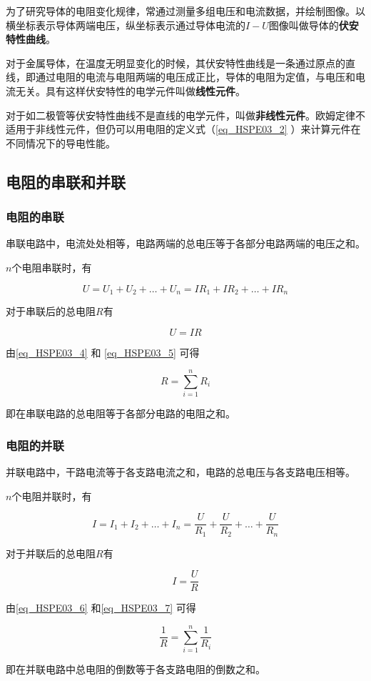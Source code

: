 为了研究导体的电阻变化规律，常通过测量多组电压和电流数据，并绘制图像。以横坐标表示导体两端电压，纵坐标表示通过导体电流的$I-U$图像叫做导体的\textbf{伏安特性曲线}。

对于金属导体，在温度无明显变化的时候，其伏安特性曲线是一条通过原点的直线，即通过电阻的电流与电阻两端的电压成正比，导体的电阻为定值，与电压和电流无关。具有这样伏安特性的电学元件叫做\textbf{线性元件}。

对于如二极管等伏安特性曲线不是直线的电学元件，叫做\textbf{非线性元件}。欧姆定律不适用于非线性元件，但仍可以用电阻的定义式（\autoref{eq_HSPE03_2} ）来计算元件在不同情况下的导电性能。

\subsection{电阻的串联和并联}

\subsubsection{电阻的串联}

串联电路中，电流处处相等，电路两端的总电压等于各部分电路两端的电压之和。

$n$个电阻串联时，有

\begin{equation}\label{eq_HSPE03_4}
U=U_1+U_2+\dots +U_n=IR_1+IR_2+\dots +IR_n
\end{equation}

对于串联后的总电阻$R$有

\begin{equation}\label{eq_HSPE03_5}
U=IR
\end{equation}

由\autoref{eq_HSPE03_4} 和 \autoref{eq_HSPE03_5} 可得

\begin{equation}
R=\sum_{i=1}^{n}R_i
\end{equation}

即在串联电路的总电阻等于各部分电路的电阻之和。

\subsubsection{电阻的并联}

并联电路中，干路电流等于各支路电流之和，电路的总电压与各支路电压相等。

$n$个电阻并联时，有

\begin{equation}\label{eq_HSPE03_6}
I=I_1+I_2+\dots +I_n=\frac{U}{R_1}+\frac{U}{R_2}+\dots +\frac{U}{R_n}
\end{equation}

对于并联后的总电阻$R$有

\begin{equation}\label{eq_HSPE03_7}
I=\frac{U}{R}
\end{equation}

由\autoref{eq_HSPE03_6} 和\autoref{eq_HSPE03_7} 可得

\begin{equation}
\frac{1}{R}=\sum_{i=1}^{n}\frac{1}{R_i}
\end{equation}

即在并联电路中总电阻的倒数等于各支路电阻的倒数之和。
